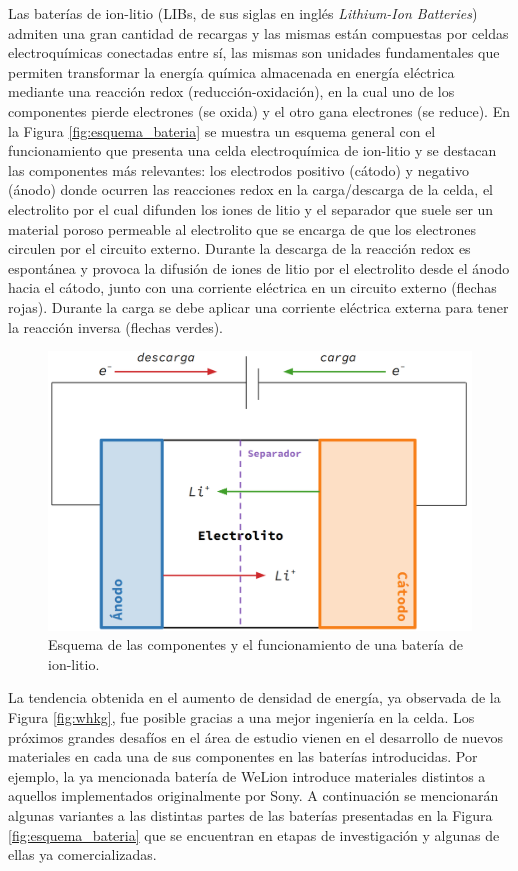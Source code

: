 Las baterías de ion-litio (LIBs, de sus siglas en inglés \textit{Lithium-Ion Batteries}) 
admiten una gran cantidad de recargas y las mismas están 
compuestas por celdas electroquímicas conectadas entre sí, las mismas son unidades 
fundamentales que permiten transformar la energía química almacenada en energía
eléctrica mediante una reacción redox (reducción-oxidación), en la cual uno de los 
componentes pierde electrones (se oxida) y el otro gana electrones (se reduce).
En la Figura \ref{fig:esquema_bateria} se muestra un esquema general con el 
funcionamiento que presenta una celda electroquímica de ion-litio y se destacan 
las componentes más relevantes: los electrodos positivo (cátodo) y negativo (ánodo) 
donde ocurren las reacciones redox en la carga/descarga de la celda, el electrolito 
por el cual difunden los iones de litio y el separador que suele ser un material 
poroso permeable al electrolito que se encarga de que los electrones circulen por 
el circuito externo. Durante la descarga de la reacción redox es espontánea y 
provoca la difusión de iones de litio por el electrolito desde el ánodo hacia el 
cátodo, junto con una corriente eléctrica en un circuito externo (flechas rojas). 
Durante la carga se debe aplicar una corriente eléctrica externa para tener la 
reacción inversa (flechas verdes).
\begin{figure}[h!]
    \centering
    \includegraphics[width=.8\textwidth]{Introduccion/baterias/esquema_bateria.png}
    \caption{Esquema de las componentes y el funcionamiento de una batería de 
    ion-litio.}
    \label{fig:esquema-bateria}
\end{figure}

La tendencia obtenida en el aumento de densidad de energía, ya observada de la 
Figura \ref{fig:whkg}, fue posible gracias a una mejor ingeniería en la celda. 
Los próximos grandes desafíos en el área de estudio vienen en el desarrollo de 
nuevos materiales en cada una de sus componentes en las baterías introducidas.
Por ejemplo, la ya mencionada batería de WeLion introduce materiales distintos 
a aquellos implementados originalmente por Sony. A continuación se mencionarán
algunas variantes a las distintas partes de las baterías presentadas en la
Figura \ref{fig:esquema_bateria} que se encuentran en etapas de investigación 
y algunas de ellas ya comercializadas.

